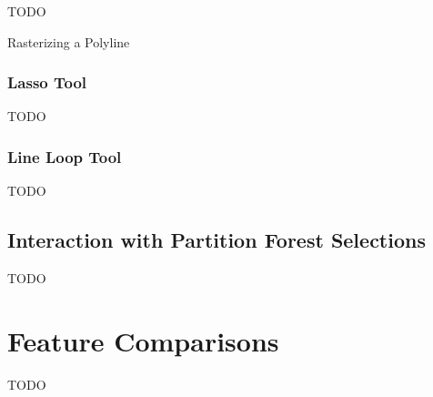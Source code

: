 TODO

\begin{stulisting}[p]
\caption{Rasterizing a Polyline}
\label{code:appendixval-rasterizepolyline}

\end{stulisting}

\subsubsection{Lasso Tool}

TODO

\subsubsection{Line Loop Tool}

TODO

\subsection{Interaction with Partition Forest Selections}
\label{subsec:appendixval-selectioninteraction}

TODO

\section{Feature Comparisons}

TODO
